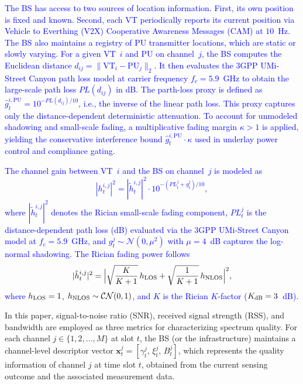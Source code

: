 \documentclass[journal]{IEEEtran}
\newcommand{\revise}[1]{\textcolor{blue}{#1}}
\begin{document}
\par
\revise{The BS has access to two sources of location information. 
First, its own position is fixed and known. Second, each VT periodically reports its current position via Vehicle to Everthing (V2X) 
Cooperative Awareness Messages (CAM) at $10$~Hz. The BS also maintains a registry of PU transmitter locations, 
which are static or slowly varying. For a given VT~$i$ and PU on channel~$j$, the BS computes the Euclidean distance $d_{ij} = \|\text{VT}_i - \text{PU}_j\|_2$. 
It then evaluates the 3GPP UMi-Street Canyon path loss model at carrier frequency $f_c = 5.9$~GHz to obtain the large-scale path loss $PL(d_{ij})$ in dB. The parth-loss 
proxy is defined as $\hat{g}_t^{i,\mathrm{PU}} = 10^{-PL(d_{ij})/10}$, i.e., the inverse of the linear path loss. This proxy captures only the distance-dependent deterministic attenuation. To account for unmodeled shadowing and small-scale fading,
a multiplicative fading margin $\kappa > 1$ is applied, yielding the conservative interference bound $\hat{g}_t^{i,\mathrm{PU}} \cdot \kappa$ used in underlay power control and compliance gating.}
\par

\revise{The channel gain between VT~$i$ and the BS on channel~$j$ is modeled as
\begin{equation}
|h_t^{i,j}|^2 = |\tilde{h}_t^{i,j}|^2 \cdot 10^{-(PL_t^{j} + g_t^{j})/10},
\end{equation}
where $|\tilde{h}_t^{i,j}|^2$ denotes the Rician small-scale fading component,
$PL_t^{j}$ is the distance-dependent path loss (dB) evaluated via the 3GPP UMi-Street Canyon model at $f_c=5.9$~GHz, and $g_t^{j}\sim\mathcal{N}(0,\mu^2)$ with $\mu=4$~dB captures the log-normal shadowing.
The Rician fading power follows
\begin{equation}
|\tilde{h}_t^{i,j}|^2 = \Bigl|\sqrt{\frac{K}{K+1}}\,h_{\rm LOS} + \sqrt{\frac{1}{K+1}}\,h_{\rm NLOS}\Bigr|^2,
\end{equation}
where $h_{\rm LOS}=1$, $h_{\rm NLOS}\sim\mathcal{CN}(0,1)$, and $K$ is the Rician $K$-factor ($K_{\rm dB}=3$~dB).}
\par
In this paper, signal-to-noise ratio (SNR), received signal strength (RSS), and bandwidth are employed as three metrics for characterizing spectrum quality. For each channel $j\in\{1,2,\ldots,M\}$ at slot $t$, the BS (or the infrastructure) maintains a channel-level descriptor vector
$\mathbf{x}_t^{j}=[\gamma_t^{j},\,\xi_t^{j},\,B_t^{j}]$, which represents the quality information of channel 
$j$ at time slot $t$, obtained from the current sensing outcome and the associated measurement data.\par
\end{document}
